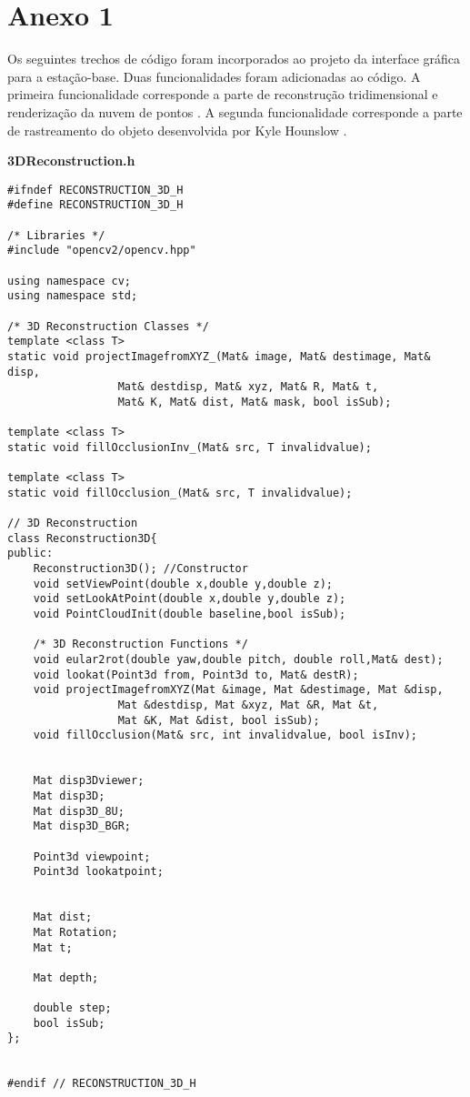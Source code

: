 \chapter{Anexo 1}
\label{Anexo1}

Os seguintes trechos de código foram incorporados ao projeto da interface gráfica para a estação-base. Duas funcionalidades foram adicionadas ao código. A primeira funcionalidade corresponde a parte de reconstrução tridimensional e renderização da nuvem de pontos \cite{UEDA2011}. A segunda funcionalidade corresponde a parte de rastreamento do objeto desenvolvida por Kyle Hounslow \cite{Hounslow2013}. 


\lstset {language=C++}
\textbf{3DReconstruction.h}
\begin{lstlisting}[basicstyle=\tiny]
#ifndef RECONSTRUCTION_3D_H
#define RECONSTRUCTION_3D_H

/* Libraries */
#include "opencv2/opencv.hpp"

using namespace cv;
using namespace std;

/* 3D Reconstruction Classes */
template <class T>
static void projectImagefromXYZ_(Mat& image, Mat& destimage, Mat& disp, 
				 Mat& destdisp, Mat& xyz, Mat& R, Mat& t, 
				 Mat& K, Mat& dist, Mat& mask, bool isSub);

template <class T>
static void fillOcclusionInv_(Mat& src, T invalidvalue);

template <class T>
static void fillOcclusion_(Mat& src, T invalidvalue);

// 3D Reconstruction
class Reconstruction3D{
public:
    Reconstruction3D(); //Constructor
    void setViewPoint(double x,double y,double z);
    void setLookAtPoint(double x,double y,double z);
    void PointCloudInit(double baseline,bool isSub);

    /* 3D Reconstruction Functions */
    void eular2rot(double yaw,double pitch, double roll,Mat& dest);
    void lookat(Point3d from, Point3d to, Mat& destR);
    void projectImagefromXYZ(Mat &image, Mat &destimage, Mat &disp, 
			     Mat &destdisp, Mat &xyz, Mat &R, Mat &t,
			     Mat &K, Mat &dist, bool isSub);
    void fillOcclusion(Mat& src, int invalidvalue, bool isInv);


    Mat disp3Dviewer;
    Mat disp3D;
    Mat disp3D_8U;
    Mat disp3D_BGR;

    Point3d viewpoint;
    Point3d lookatpoint;


    Mat dist;
    Mat Rotation;
    Mat t;

    Mat depth;

    double step;
    bool isSub;
};


#endif // RECONSTRUCTION_3D_H
\end{lstlisting}

